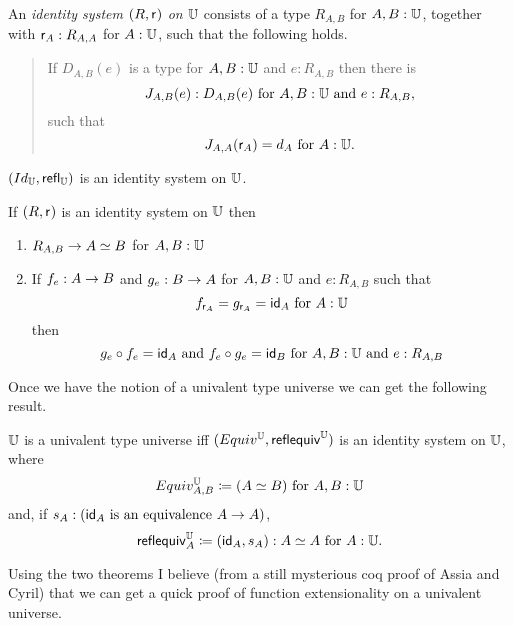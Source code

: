 \begin{defn} An {\em identity system $(R,\sfr{})$ on $\bbU$} consists of a type $R_{A,B}$ for $A,B:\bbU$, together with $\sfr{A}:R_{A,A}$ for $A:\bbU$, such that the following holds.  
\begin{quote}
If $D_{A,B}(e)$ is a type for $A,B:\bbU$ and $e:R_{A,B}$ then there is   
  \[ J_{A,B}(e):D_{A,B}(e)\mbox{ for } A,B:\bbU \mbox{ and } e:R_{A,B},\] 
such that
  \[ J_{A,A}(\sfr{A})=d_A\mbox{ for } A:\bbU.\]
\end{quote}
\end{defn}
\begin{eg}
$(Id_\bbU,\refl{\bbU})$ is an identity system on $\bbU$.
\end{eg}
\begin{thm}
If $(R,\sfr{})$ is an identity system on $\bbU$ then
\begin{enumerate}
\item $R_{A,B}\ra \eqv{A}{B}$ for $A,B:\bbU$
\item If $f_e:A\ra B$ and $g_e:B\ra A$ for $A,B:\bbU$ and $e:R_{A,B}$ such that 
  \[ f_{\sfr{A}} = g_{\sfr{A}}=\idfunc[A]\mbox{ for } A:\bbU\] 
then
  \[ g_e\circ f_e =\idfunc[A]\mbox{ and } f_e\circ g_e = \idfunc[B]
      \mbox{ for }  A,B:\bbU \mbox{ and } e:R_{A,B} \]
\end{enumerate}
\end{thm}
\newcommand{\sfequiv}[1]{{\sf reflequiv}^\bbU_{#1}}
\begin{rmk} Once we have the notion of a univalent type universe we can get the following result. 
\end{rmk}
\begin{thm}
$\bbU$ is a univalent type universe iff $(Equiv^\bbU,\sfequiv{})$ is an identity system on $\bbU$, where
  \[ Equiv^\bbU_{A,B}\defeq (\eqv{A}{B})\mbox{ for } A,B:\bbU\]
and, if $s_A: (\idfunc[A]\mbox{ is an equivalence }A\ra A)$,
  \[ \sfequiv{A}\defeq (\idfunc[A],s_A):\eqv{A}{A}\mbox{ for } A:\bbU.\]
\end{thm}


Using the two theorems I believe (from a still mysterious coq proof of Assia and Cyril) that we can get a quick proof of function extensionality on a univalent universe.
